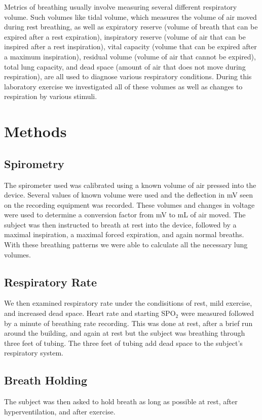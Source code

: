 \documentclass[12pt]{article}
\begin{document}
Metrics of breathing usually involve measuring several different respiratory volume. Such volumes like tidal volume, which measures the volume of air moved during rest breathing, as well as expiratory reserve (volume of breath that can be expired after a rest expiration), inspiratory reserve (volume of air that can be inspired after a rest inspiration), vital capacity (volume that can be expired after a maximum inspiration), residual volume (volume of air that cannot be expired), total lung capacity, and dead space (amount of air that does not move during respiration), are all used to diagnose various respiratory conditions. During this laboratory exercise we investigated all of these volumes as well as changes to respiration by various stimuli.

\section{Methods}

\subsection{Spirometry}
The spirometer used was calibrated using a known volume of air pressed into the device. Several values of known volume were used and the deflection in mV seen on the recording equipment was recorded. These volumes and changes in voltage were used to determine a conversion factor from mV to mL of air moved. The subject was then instructed to breath at rest into the device, followed by a maximal inspiration, a maximal forced expiration, and again normal breaths. With these breathing patterns we were able to calculate all the necessary lung volumes.

\subsection{Respiratory Rate}
We then examined respiratory rate under the condisitions of rest, mild exercise, and increased dead space. Heart rate and starting SPO$_2$ were measured followed by a minute of breathing rate recording. This was done at rest, after a brief run around the building, and again at rest but the subject was breathing through three feet of tubing. The three feet of tubing add dead space to the subject's respiratory system.

\subsection{Breath Holding}
The subject was then asked to hold breath as long as possible at rest, after hyperventilation, and after exercise.
\end{document}
